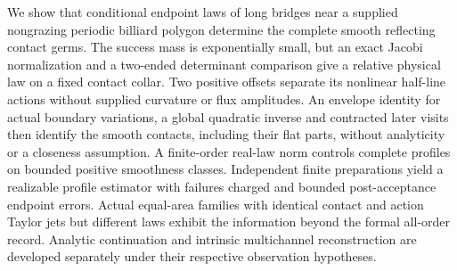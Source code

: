We show that conditional endpoint laws of long bridges near a supplied
nongrazing periodic billiard polygon determine the complete smooth
reflecting contact germs.  The success mass is exponentially small, but
an exact Jacobi normalization and a two-ended determinant comparison give
a relative physical law on a fixed contact collar.  Two positive offsets
separate its nonlinear half-line actions without supplied curvature or
flux amplitudes.  An envelope identity for actual boundary variations,
a global quadratic inverse and contracted later visits then identify the
smooth contacts, including their flat parts, without analyticity or a
closeness assumption.  A finite-order real-law norm controls complete
profiles on bounded positive smoothness classes.  Independent finite
preparations yield a realizable profile estimator with failures charged
and bounded post-acceptance endpoint errors.  Actual equal-area families
with identical contact and action Taylor jets but different laws exhibit
the information beyond the formal all-order record.  Analytic
continuation and intrinsic multichannel reconstruction are developed
separately under their respective observation hypotheses.
